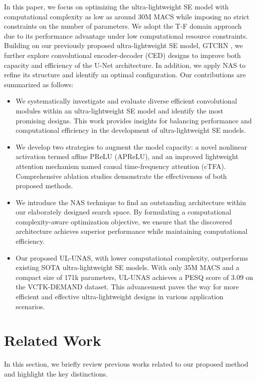 \documentclass[journal]{IEEEtran}
\newcommand{\rev}[1]{#1}
\begin{document}
In this paper, we focus on optimizing the ultra-lightweight SE model with computational complexity as low as around 30M MACS while imposing no strict constraints on the number of parameters. We adopt the T-F domain approach due to its performance advantage under low computational resource constraints. Building on our previously proposed ultra-lightweight SE model, GTCRN \cite{GTCRN}, we further explore convolutional encoder-decoder (CED) designs to improve both capacity and efficiency of the U-Net architecture. In addition, we apply NAS to refine its structure and identify an optimal configuration. Our contributions are summarized as follows:
\begin{itemize}
    \item {We systematically investigate and evaluate diverse efficient convolutional modules within an ultra-lightweight SE model and identify the most promising designs. This work provides insights for balancing performance and computational efficiency in the development of ultra-lightweight SE models.}
    \item {We develop two strategies to augment the model capacity: a novel nonlinear activation termed affine PReLU (APReLU), and an improved lightweight attention mechanism named causal time-frequency attention (cTFA). Comprehensive ablation studies demonstrate the effectiveness of both proposed methods.}
    \item {We introduce the NAS technique to find an outstanding architecture within our elaborately designed search space. By formulating a computational complexity-aware optimization objective, we ensure that the discovered architecture achieves superior performance while maintaining computational efficiency.}
    \item {Our proposed UL-UNAS, with lower computational complexity, outperforms existing SOTA ultra-lightweight SE models. With only \rev{35M} MACS and a compact size of \rev{171k} parameters, UL-UNAS achieves a PESQ score of 3.09 on the VCTK-DEMAND dataset. This advancement paves the way for more efficient and effective ultra-lightweight designs in various application scenarios.}
\end{itemize}

\section{Related Work}
In this section, we briefly review previous works related to our proposed method and highlight the key distinctions.
\end{document}
